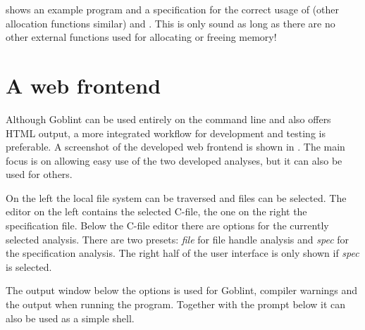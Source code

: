  shows an example program and  a specification for the correct usage of  (other allocation functions similar) and .
This is only sound as long as there are no other external functions used for allocating or freeing memory!





\chapter{A web frontend}
Although Goblint can be used entirely on the command line and also offers HTML output, a more integrated workflow for development and testing is preferable.
A screenshot of the developed web frontend is shown in .
The main focus is on allowing easy use of the two developed analyses, but it can also be used for others.

On the left the local file system can be traversed and files can be selected.
The editor on the left contains the selected C-file, the one on the right the specification file.
Below the C-file editor there are options for the currently selected analysis. There are two presets: \textit{file} for file handle analysis and \textit{spec} for the specification analysis. The right half of the user interface is only shown if \textit{spec} is selected.

The output window below the options is used for Goblint, compiler warnings and the output when running the program. Together with the prompt below it can also be used as a simple shell.

